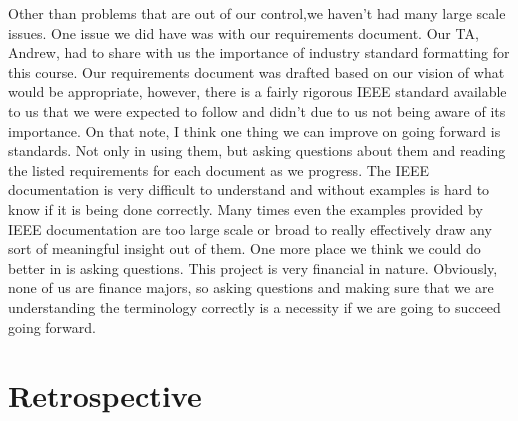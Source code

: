 \documentclass[letterpaper,10pt,titlepage,journal,compsoc,draftclsnofoot,onecolumn]{IEEEtran}
\begin{document}
Other than problems that are out of our control,we haven't had many large scale issues. One issue we did have was with our requirements document. Our TA, Andrew, had to share with us the importance of industry standard formatting for this course. Our requirements document was drafted based on our vision of what would be appropriate, however, there is a fairly rigorous IEEE standard available to us that we were expected to follow and didn't due to us not being aware of its importance. On that note, I think one thing we can improve on going forward is standards. Not only in using them, but asking questions about them and reading the listed requirements for each document as we progress. The IEEE documentation is very difficult to understand and without examples is hard to know if it is being done correctly. Many times even the examples provided by IEEE documentation are too large scale or broad to really effectively draw any sort of meaningful insight out of them. One more place we think we could do better in is asking questions. This project is very financial in nature. Obviously, none of us are finance majors, so asking questions and making sure that we are understanding the terminology correctly is a necessity if we are going to succeed going forward.


\section{Retrospective}
\end{document}
